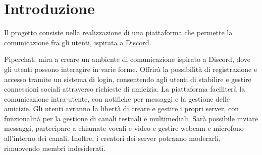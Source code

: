 \chapter{Introduzione}

Il progetto consiste nella realizzazione di una piattaforma che permette la comunicazione fra gli utenti, ispirata a \href{https://discord.com}{Discord}.

Piperchat, mira a creare un ambiente di comunicazione ispirato a Discord, dove gli utenti possono interagire in varie forme.
%
Offrirà la possibilità di registrazione e accesso tramite un sistema di login, consentendo agli utenti di stabilire e gestire connessioni sociali attraverso richieste di amicizia.
%
La piattaforma faciliterà la comunicazione intra-utente, con notifiche per messaggi e la gestione delle amicizie.
%
Gli utenti avranno la libertà di creare e gestire i propri server, con funzionalità per la gestione di canali testuali e multimediali.
%
Sarà possibile inviare messaggi, partecipare a chiamate vocali e video e gestire webcam e microfono all'interno dei canali.
%
Inoltre, i creatori dei server potranno moderarli, rimuovendo membri indesiderati.
